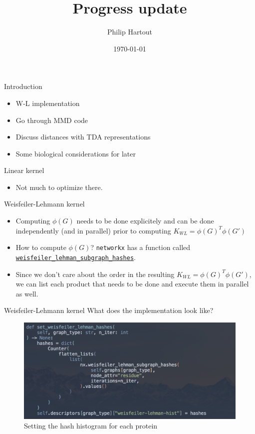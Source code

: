 \documentclass[aspectratio=169, 10pt, dvipsnames, handout]{beamer}
\title{Progress update}
\date{\today}
\author{Philip Hartout}
\begin{document}
\maketitle

\begin{frame}[fragile]{Introduction}


  \begin{itemize}
  \item W-L implementation
  \item Go through MMD code
  \item Discuss distances with TDA representations
  \item Some biological considerations for later
  \end{itemize}
\end{frame}

\begin{frame}[fragile]{Linear kernel}
  \begin{itemize}
  \item Not much to optimize there.
  \end{itemize}
\end{frame}


\begin{frame}[fragile]{Weisfeiler-Lehmann kernel}
  \begin{itemize}
  \item Computing $\phi(G)$ needs to be done explicitely and can be done
    independently (and in parallel) prior to computing $K_{WL}=\phi(G)^T\phi(G')$
  \item How to compute $\phi(G)$? \texttt{networkx} has a function called
    \href{https://networkx.org/documentation/stable/reference/algorithms/generated/networkx.algorithms.graph_hashing.weisfeiler_lehman_subgraph_hashes.html?highlight=weisfeiler_lehman_subgraph_hashes#networkx.algorithms.graph_hashing.weisfeiler_lehman_subgraph_hashes}{\texttt{weisfeiler\_lehman\_subgraph\_hashes}}.
  \item Since we don't care about the order in the resulting
    $K_{WL}=\phi(G)^T\phi(G')$, we can list each product that needs to be done
    and execute them in parallel as well.
  \end{itemize}
\end{frame}


\begin{frame}[fragile]{Weisfeiler-Lehmann kernel}
  What does the implementation look like?
  \begin{figure}
    \centering
    \includegraphics[width=.6\textwidth]{figures/setting_hash.png}
    \caption{Setting the hash histogram for each protein}
    \label{fig:hash_setting}
  \end{figure}
\end{frame}
\end{document}
